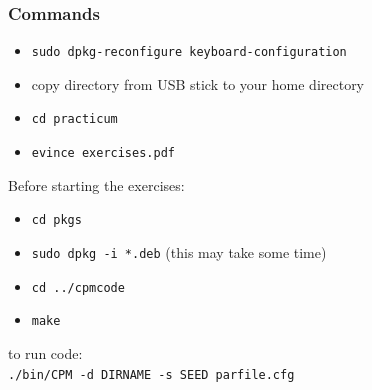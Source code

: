 \documentclass[compress]{beamer}
\begin{document}
\begin{frame}
\frametitle{Commands}   
\begin{itemize}
 \item \texttt{sudo dpkg-reconfigure keyboard-configuration}
 \item copy directory from USB stick to your home directory
 \item \texttt{cd practicum}
 \item \texttt{evince exercises.pdf}
\end{itemize}
Before starting the exercises:
\begin{itemize}
 \item \texttt{cd pkgs}
 \item \texttt{sudo dpkg -i *.deb} (this may take some time)
 \item \texttt{cd ../cpmcode  }
 \item \texttt{make}
\end{itemize}
to run code:\\
\texttt{./bin/CPM -d DIRNAME -s SEED parfile.cfg}
\end{frame}
\end{document}
